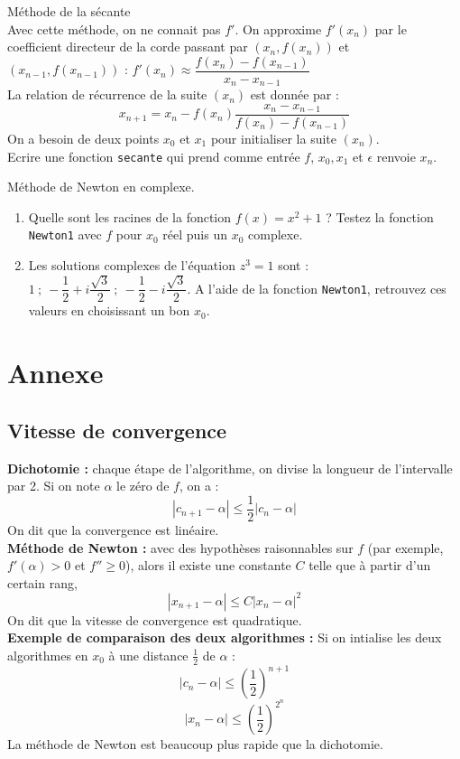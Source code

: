 \begin{exercice}M\' ethode de la s\' ecante\\
Avec cette m\' ethode, on ne connait pas $f'$. On approxime $f'(x_n)$ par le coefficient directeur de la corde passant par $(x_n,f(x_n))$ et $(x_{n-1},f(x_{n-1}))$ : $f'(x_n)\approx \dfrac{f(x_{n})-f(x_{n-1})}{x_{n}-x_{n-1}}$\\
La relation de r\' ecurrence de la suite $(x_n)$ est donn\' ee par :
\[x_{n+1}=x_n-f(x_n)\dfrac{x_{n}-x_{n-1}}{f(x_{n})-f(x_{n-1})}\]
On a besoin de deux points $x_0$ et $x_1$ pour initialiser la suite $(x_n)$.\\
Ecrire une fonction \verb?secante? qui prend comme entrée $f$, $x_0,x_1$ et $\epsilon$ renvoie $x_n$.
\end{exercice}





\begin{exercice}M\' ethode de Newton en complexe.
\begin{enumerate}
\item Quelle sont les racines de la fonction $f(x)=x^2+1$ ? Testez la fonction \verb?Newton1? avec $f$ pour $x_0$ r\' eel puis un $x_0$ complexe. 
\item Les solutions complexes de l'\' equation $z^3=1$ sont :  $1\ ;\  -\dfrac{1}{2}+i\dfrac{\sqrt{3}}{2}\ ; \ -\dfrac{1}{2}-i\dfrac{\sqrt{3}}{2}$. A l'aide de la fonction \verb?Newton1?, retrouvez ces valeurs en choisissant un bon $x_0$.%
\end{enumerate}
\end{exercice}



\newpage

\section{Annexe}
\subsection{Vitesse de convergence}
\noindent \textbf{Dichotomie :} chaque \' etape de l'algorithme, on divise la longueur de l'intervalle par 2. Si on note $\alpha$ le z\' ero de $f$, on a :
\[|c_{n+1}-\alpha|\leqslant \dfrac{1}{2}|c_n-\alpha|\]
On dit que la convergence est lin\' eaire.\bigskip \\
\textbf{M\' ethode de Newton :} avec des hypoth\` eses raisonnables sur $f$ (par exemple, $f'(\alpha)>0$ et $f''\geqslant 0$), alors il existe une constante $C$ telle que \` a partir d'un certain rang, 
\[|x_{n+1}-\alpha|\leqslant C|x_n-\alpha|^{2}\]
On dit que la vitesse de convergence est quadratique.\bigskip \\
\textbf{Exemple de comparaison des deux algorithmes :} Si on intialise les deux algorithmes en $x_0$ \` a une distance $\frac{1}{2}$ de $\alpha$ : \\
\[|c_n-\alpha|\leqslant \left(\dfrac{1}{2}\right)^{n+1}\]
\[|x_n-\alpha|\leqslant \left(\dfrac{1}{2}\right)^{2^n}\]
La m\' ethode de Newton est beaucoup plus rapide que la dichotomie.

